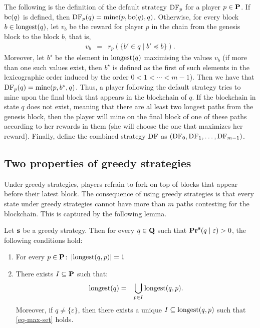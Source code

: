 The following is the definition of the default strategy $\text{\rm DF}_p$ for a player $p \in \mathbf{P}$. If $\text{bc}(q)$ is defined, then $\text{\rm DF}_p(q) = \text{\rm mine}(p,\text{bc}(q),q)$. Otherwise, for every block $b \in {\text{\rm longest}}(q)$, let $v_{b}$ be the reward for player $p$ in the chain from the genesis block to the block $b$, that is,
\begin{eqnarray*}
v_{b} & = & r_p(\{b' \in q \mid b' \preceq b\}).
\end{eqnarray*}
Moreover, let $b^\star$ be the element in ${\text{\rm longest}}(q)$ maximising the values $v_{b}$ (if more than one such values exist, then $b^\star$  is defined as the first of such elements in the lexicographic order induced by the order $0 < 1 < \cdots < m-1$). Then we have that $\text{\rm DF}_p(q) = \text{\rm mine}(p,b^\star,q)$.
Thus, a player following the default strategy tries to mine upon the final block that appears in the blockchain of $q$. If the blockchain in state $q$ does not exist, meaning that there are al least two longest paths from the genesis block, then the player will mine on the final block of one of these paths according to her rewards in them (she will choose the one that maximizes her reward). Finally, define the combined strategy $\text{\rm DF}$ as $(\text{\rm DF}_0,\text{\rm DF}_1,\dots,\text{\rm DF}_{m-1})$. 


\subsection{Two properties of greedy strategies}
\label{sec-char-states-greedy}

Under greedy strategies, players refrain to fork on top of blocks that appear before their latest block.
The consequence of using 
greedy strategies is that every state 
under greedy strategies cannot have more than $m$ paths contesting for the blockchain. This is captured by the following lemma.
\begin{mylem}\label{lem-length-greedy}
Let $\mathbf{s}$ be a greedy strategy. Then for every $q \in \mathbf{Q}$ such that $\mathbf{Pr}^{\mathbf{s}}(q \mid \varepsilon) > 0$, the following conditions hold:
\begin{enumerate}
\item For every $p \in \mathbf{P}$$:$ $|{\text{\rm longest}}(q,p)| = 1$ 

\item There exists $I \subseteq \mathbf{P}$ such that$:$
\begin{eqnarray}\label{eq-max-set}
{\text{\rm longest}}(q) & = & \bigcup_{p \in I} {\text{\rm longest}}(q,p).
\end{eqnarray}
Moreover, if $q \neq \{\varepsilon\}$, then there exists a unique $I \subseteq {\text{\rm longest}}(q,p)$ such that \eqref{eq-max-set} holds.
\end{enumerate}
\end{mylem}

